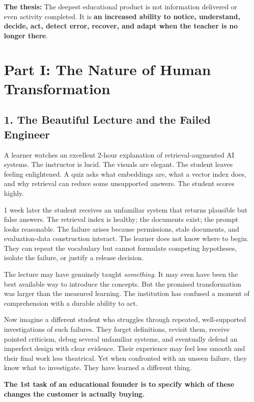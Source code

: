 \textbf{The thesis:} The deepest educational product is not information delivered or even activity completed. It is \textbf{an increased ability to notice, understand, decide, act, detect error, recover, and adapt when the teacher is no longer there}.

\section*{Part I: The Nature of Human Transformation}

\subsection*{1. The Beautiful Lecture and the Failed Engineer}

A learner watches an excellent 2-hour explanation of retrieval-augmented AI systems. The instructor is lucid. The visuals are elegant. The student leaves feeling enlightened. A quiz asks what embeddings are, what a vector index does, and why retrieval can reduce some unsupported answers. The student scores highly.

1 week later the student receives an unfamiliar system that returns plausible but false answers. The retrieval index is healthy; the documents exist; the prompt looks reasonable. The failure arises because permissions, stale documents, and evaluation-data construction interact. The learner does not know where to begin. They can repeat the vocabulary but cannot formulate competing hypotheses, isolate the failure, or justify a release decision.

The lecture may have genuinely taught \emph{something}. It may even have been the best available way to introduce the concepts. But the promised transformation was larger than the measured learning. The institution has confused a moment of comprehension with a durable ability to act.

Now imagine a different student who struggles through repeated, well-supported investigations of such failures. They forget definitions, revisit them, receive pointed criticism, debug several unfamiliar systems, and eventually defend an imperfect design with clear evidence. Their experience may feel less smooth and their final work less theatrical. Yet when confronted with an unseen failure, they know what to investigate. They have learned a different thing.

\textbf{The 1st task of an educational founder is to specify which of these changes the customer is actually buying.}

